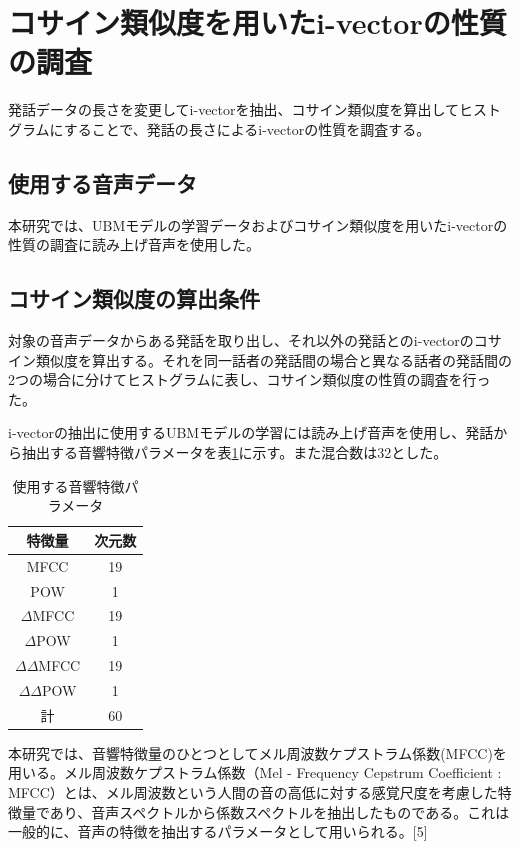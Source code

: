 \section{コサイン類似度を用いたi-vectorの性質の調査}
\label{section:pre_cos}
発話データの長さを変更してi-vectorを抽出、コサイン類似度を算出してヒストグラムにすることで、発話の長さによるi-vectorの性質を調査する。
\subsection{使用する音声データ}
本研究では、UBMモデルの学習データおよびコサイン類似度を用いたi-vectorの性質の調査に読み上げ音声\cite{ATR}を使用した。

\subsection{コサイン類似度の算出条件}
対象の音声データからある発話を取り出し、それ以外の発話とのi-vectorのコサイン類似度を算出する。それを同一話者の発話間の場合と異なる話者の発話間の2つの場合に分けてヒストグラムに表し、コサイン類似度の性質の調査を行った。\par
i-vectorの抽出に使用するUBMモデルの学習には読み上げ音声\cite{ATR}を使用し、発話から抽出する音響特徴パラメータを表\ref{iv_feature}に示す。また混合数は32とした。

\begin{table}[H]
  \begin{center}
    \caption{使用する音響特徴パラメータ}
    \label{iv_feature}
    \begin{tabular}{|c||c|} \hline
      特徴量 & 次元数\\ \hline
      MFCC & 19  \\ \hline
      POW & 1  \\ \hline
      $\Delta$MFCC & 19 \\ \hline
      $\Delta$POW & 1 \\ \hline
      $\Delta\Delta$MFCC & 19 \\ \hline
      $\Delta\Delta$POW & 1 \\ \hline
      計 & 60 \\ \hline
    \end{tabular}
  \end{center}
\end{table}

本研究では、音響特徴量のひとつとしてメル周波数ケプストラム係数(MFCC)を用いる。メル周波数ケプストラム係数（Mel - Frequency Cepstrum Coefficient : MFCC）とは、メル周波数という人間の音の高低に対する感覚尺度を考慮した特徴量であり、音声スペクトルから係数スペクトルを抽出したものである。これは一般的に、音声の特徴を抽出するパラメータとして用いられる。[5]

